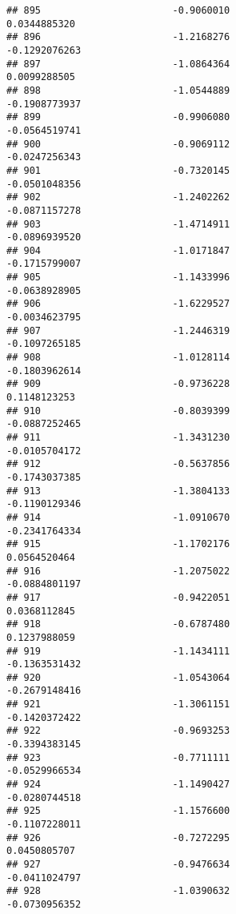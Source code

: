 \documentclass[
]{article}
\begin{document}
\begin{verbatim}
## 895                       -0.9060010                          0.0344885320
## 896                       -1.2168276                         -0.1292076263
## 897                       -1.0864364                          0.0099288505
## 898                       -1.0544889                         -0.1908773937
## 899                       -0.9906080                         -0.0564519741
## 900                       -0.9069112                         -0.0247256343
## 901                       -0.7320145                         -0.0501048356
## 902                       -1.2402262                         -0.0871157278
## 903                       -1.4714911                         -0.0896939520
## 904                       -1.0171847                         -0.1715799007
## 905                       -1.1433996                         -0.0638928905
## 906                       -1.6229527                         -0.0034623795
## 907                       -1.2446319                         -0.1097265185
## 908                       -1.0128114                         -0.1803962614
## 909                       -0.9736228                          0.1148123253
## 910                       -0.8039399                         -0.0887252465
## 911                       -1.3431230                         -0.0105704172
## 912                       -0.5637856                         -0.1743037385
## 913                       -1.3804133                         -0.1190129346
## 914                       -1.0910670                         -0.2341764334
## 915                       -1.1702176                          0.0564520464
## 916                       -1.2075022                         -0.0884801197
## 917                       -0.9422051                          0.0368112845
## 918                       -0.6787480                          0.1237988059
## 919                       -1.1434111                         -0.1363531432
## 920                       -1.0543064                         -0.2679148416
## 921                       -1.3061151                         -0.1420372422
## 922                       -0.9693253                         -0.3394383145
## 923                       -0.7711111                         -0.0529966534
## 924                       -1.1490427                         -0.0280744518
## 925                       -1.1576600                         -0.1107228011
## 926                       -0.7272295                          0.0450805707
## 927                       -0.9476634                         -0.0411024797
## 928                       -1.0390632                         -0.0730956352

\end{verbatim}
\end{document}
